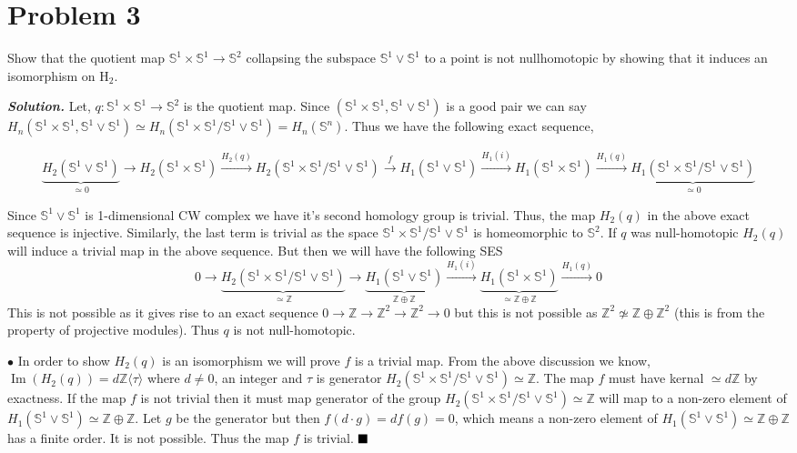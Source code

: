 \documentclass[11pt]{article}
\newcommand{\bb}[1]{\mathbb{#1}}
\newcommand{\Z}{\bb{Z}}
\newcommand{\s}{\bb{S}}
\newcommand{\sol}{ \textbf{\textit{Solution.}} }
\begin{document}
 \section{Problem 3}

 \begin{prob}{}{}
    Show that the quotient map $\mathbb{S}^{1} \times \mathbb{S}^{1} \rightarrow \mathbb{S}^{2}$ collapsing the subspace $\mathbb{S}^{1} \vee \mathbb{S}^{1}$ to a point is not nullhomotopic by showing that it induces an isomorphism on $\mathrm{H}_{2}$.
 \end{prob}
 \sol Let, $q :\s^1 \times \s^1 \to \s^2$ is the quotient map. Since $(\s^1 \times \s^1, \s^1 \vee \s^1)$ is a good pair we can say $H_n(\s^1 \times \s^1, \s^1 \vee \s^1) \simeq H_n(\s^1 \times \s^1 /\s^1 \vee \s^1) =H_n(\s^n)$. Thus we have the following exact sequence, 
 
 $$\underbrace{H_2(\s^1 \vee \s^1)}_{\simeq 0} \to H_2(\s^1 \times \s^1)\xrightarrow{H_2(q)}H_2(\s^1 \times \s^1/ \s^1 \vee \s^1) \xrightarrow{f} H_1(\s^1 \vee \s^1)\xrightarrow{H_1(i)}H_1(\s^1 \times \s^1)\xrightarrow{H_1(q)} \underbrace{H_1(\s^1 \times \s^1/ \s^1 \vee \s^1)}_{\simeq 0}$$

\noindent Since $\s^1 \vee \s^1$ is 1-dimensional CW complex we have it's second homology group is trivial. Thus, the map $H_2(q)$ in the above exact sequence is injective. Similarly, the last term is trivial as the space $\s^1 \times \s^1 / \s^1 \vee \s^1$ is homeomorphic to $\s^2$. If $q$ was null-homotopic $H_2(q)$ will induce a trivial map in the above sequence. But then we will have the following SES $$0 \to \underbrace{H_2(\s^1 \times \s^1/ \s^1 \vee \s^1)}_{\simeq \Z} \to \underbrace{H_1(\s^1 \vee \s^1)}_{\Z \oplus \Z}\xrightarrow{H_1(i)}\underbrace{H_1(\s^1 \times \s^1)}_{\simeq \Z \oplus \Z}\xrightarrow{H_1(q)} 0$$
This is not possible as it gives rise to an exact sequence $0 \to \Z \to \Z^2 \to \Z^2\to 0$ but this is not possible as $\Z^2 \not\simeq \Z \oplus \Z^2$ (this is from the property of projective modules). Thus $q$ is not null-homotopic. 

\vspace*{0.2cm}

\noindent $\bullet$ In order to show $H_2(q)$ is an isomorphism we will prove $f$ is a trivial map. From the above discussion we know, $\operatorname{Im}(H_2(q)) = d \Z\langle \tau \rangle$ where $d \neq 0$, an integer and $\tau$ is generator $H_2(\s^1 \times \s^1/ \s^1 \vee \s^1) \simeq \Z$. The map $f$ must have kernal $\simeq d\Z$ by exactness. If the map $f$ is not trivial then it must map generator of the group $H_2(\s^1 \times \s^1/ \s^1 \vee \s^1) \simeq \Z$ will map to a non-zero element of $H_1(\s^1\vee \s^1)\simeq \Z \oplus \Z$. Let $g$ be the generator but then $f(d\cdot g) = df(g) =0$, which means a non-zero element of $H_1(\s^1\vee \s^1)\simeq \Z \oplus \Z$ has a finite order. It is not possible. Thus the map $f$ is trivial. $\hfill \blacksquare$
\end{document}
